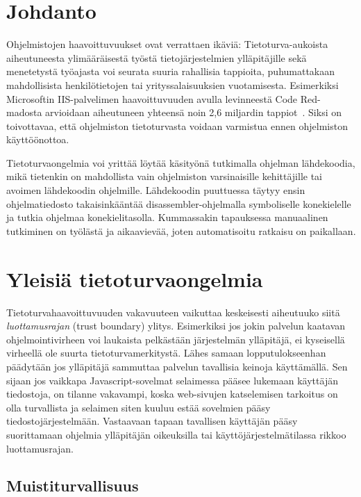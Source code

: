 \section{Johdanto}

Ohjelmistojen haavoittuvuukset ovat verrattaen ikäviä:
Tietoturva-aukoista aiheutuneesta ylimääräisestä työstä tietojärjestelmien ylläpitäjille
sekä menetetystä työajasta voi seurata suuria rahallisia tappioita,
puhumattakaan mahdollisista henkilötietojen tai yrityssalaisuuksien vuotamisesta.
Esimerkiksi Microsoftin IIS-palvelimen haavoittuvuuden avulla levinneestä Code Red-madosta
arvioidaan aiheutuneen yhteensä noin 2,6 miljardin tappiot~\cite{CodeRed}.
Siksi on toivottavaa, että ohjelmiston tietoturvasta voidaan varmistua ennen ohjelmiston käyttöönottoa.

Tietoturvaongelmia voi yrittää löytää käsityönä tutkimalla ohjelman lähdekoodia,
mikä tietenkin on mahdollista vain ohjelmiston varsinaisille kehittäjille
tai avoimen lähdekoodin ohjelmille.
Lähdekoodin puuttuessa täytyy ensin ohjelmatiedosto takaisinkääntää
disassembler-ohjelmalla symboliselle konekielelle
ja tutkia ohjelmaa konekielitasolla.
Kummassakin tapauksessa manuaalinen tutkiminen on työlästä ja aikaavievää, joten automatisoitu ratkaisu on paikallaan.

\section{Yleisiä tietoturvaongelmia}

Tietoturvahaavoittuvuuden vakavuuteen vaikuttaa keskeisesti aiheutuuko siitä \emph{luottamusrajan}
(trust boundary) ylitys.
Esimerkiksi jos jokin palvelun kaatavan ohjelmointivirheen voi laukaista pelkästään järjestelmän
ylläpitäjä, ei kyseisellä virheellä ole suurta tietoturvamerkitystä.
Lähes samaan lopputulokseenhan päädytään jos ylläpitäjä sammuttaa palvelun tavallisia keinoja käyttämällä.
Sen sijaan jos vaikkapa Javascript-sovelmat selaimessa pääsee lukemaan käyttäjän tiedostoja,
on tilanne vakavampi, koska web-sivujen katselemisen tarkoitus on olla turvallista ja selaimen siten
kuuluu estää sovelmien pääsy tiedostojärjestelmään.
Vastaavaan tapaan tavallisen käyttäjän pääsy suorittamaan ohjelmia ylläpitäjän oikeuksilla
tai käyttöjärjestelmätilassa rikkoo luottamusrajan.

\subsection{Muistiturvallisuus}

